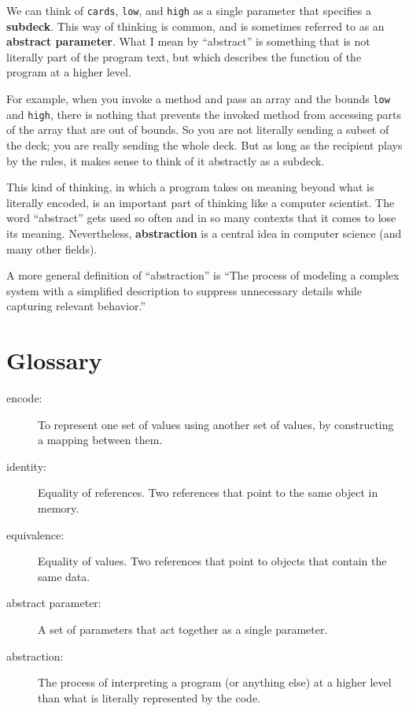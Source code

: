 \documentclass[12pt]{book}
\theoremstyle{exercise}
\begin{document}
We can think of {\tt cards}, {\tt low}, and {\tt high}
as a single parameter that specifies a {\bf subdeck}.
This way of thinking is common, and is sometimes referred
to as an {\bf abstract parameter}.  What I mean by ``abstract'' is
something that is not literally part of the program text, but which
describes the function of the program at a higher level.

For example, when you invoke a method and pass an array and the bounds
{\tt low} and {\tt high}, there is nothing that prevents the invoked
method from accessing parts of the array that are out of bounds.  So
you are not literally sending a subset of the deck; you are really
sending the whole deck.  But as long as the recipient plays by the
rules, it makes sense to think of it abstractly as a subdeck.

This kind of thinking, in which a program takes on meaning beyond what
is literally encoded, is an important part of thinking like a computer
scientist.  The word ``abstract'' gets used so often and in so many
contexts that it comes to lose its meaning.  Nevertheless, {\bf abstraction}
is a central idea in computer science (and many other fields).

A more general definition of ``abstraction'' is ``The process of
modeling a complex system with a simplified description to
suppress unnecessary details while capturing relevant behavior.''


\section{Glossary}

\begin{description}

\item[encode:]  To represent one set of values using another
set of values, by constructing a mapping between them.

\item[identity:]  Equality of references.  Two
references that point to the same object in memory.

\item[equivalence:]  Equality of values.  Two references
that point to objects that contain the same data.

\item[abstract parameter:]  A set of parameters that act together
as a single parameter.

\item[abstraction:]  The process of interpreting a program
(or anything else) at a higher level than what is literally
represented by the code.


\end{description}
\end{document}
